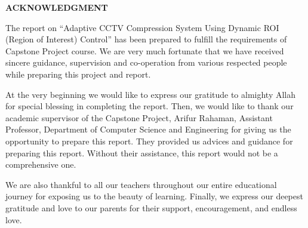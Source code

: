 \clearpage
\thispagestyle{plain}


\begin{center}
    \textbf{\Large ACKNOWLEDGMENT}
\end{center}

\vspace{0.5cm}

The report on ``Adaptive CCTV Compression System Using Dynamic ROI (Region of Interest) Control'' has been prepared to fulfill the requirements of Capstone 
Project course. We are very much fortunate that we have received sincere guidance, 
supervision and co-operation from various respected people while preparing this project 
and report.

\vspace{0.5cm}   %

At the very beginning we would like to express our gratitude to almighty Allah for 
special blessing in completing the report. Then, we would like to thank our academic 
supervisor of the Capstone Project, Arifur Rahaman, Assistant Professor, Department of Computer Science and 
Engineering for giving us the opportunity to prepare this report. They provided us 
advices and guidance for preparing this report. Without their assistance, this report 
would not be a comprehensive one.

\vspace{0.5cm}   %

We are also thankful to all our teachers throughout our entire educational journey for 
exposing us to the beauty of learning. Finally, we express our deepest gratitude and 
love to our parents for their support, encouragement, and endless love.
